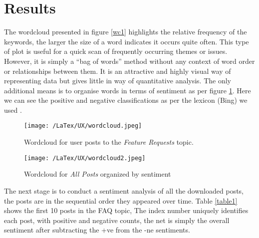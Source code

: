 \documentclass{svproc}
\begin{document}
\section{Results}
The wordcloud presented in figure \ref{wc1} highlights the relative frequency of the keywords, the larger the size of a word indicates it occurs quite often.  This type of plot is useful for a quick scan of frequently occurring themes or issues. However, it is simply a ``bag of words'' method without any context of word order or relationships between them. It is an attractive and highly visual way of representing data but gives little in way of quantitative analysis. The only additional means is to organise words in terms of sentiment as per figure \ref{wc2}. Here we can see the positive and negative classifications as per the lexicon (Bing) we used \cite{Hu2004}.

\begin{figure}[h]
	\centering
	\begin{minipage}{0.350\textwidth}
		\centering
		\texttt{[image: /LaTex/UX/wordcloud.jpeg]} %
		\centering \caption{Wordcloud for user posts to the {\it Feature Requests } topic.}
		\label{wc1}
	\end{minipage} \hfill
	\begin{minipage}{0.35 \textwidth}
		\centering
		\texttt{[image: /LaTex/UX/wordcloud2.jpeg]} %
		\centering \caption{Wordcloud for {\it All Posts} organized by sentiment}
		\label{wc2}
	\end{minipage}
\end{figure}



The next stage is to conduct a sentiment analysis of all the downloaded posts, the posts are in the sequential order they appeared over time.  Table \ref{table1} shows the first 10 posts in the FAQ topic, The index number uniquely identifies each post, with positive and negative  counts, the net is simply the overall sentiment after subtracting the +ve from the -ne sentiments.
\end{document}
